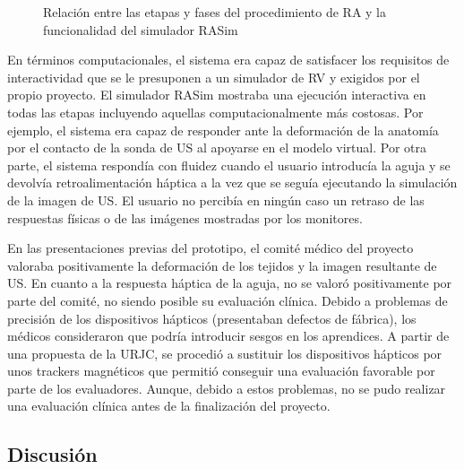  


\begin{figure}
    \centering
       \caption{Relación entre las etapas y fases del procedimiento de \ac{RA} y la funcionalidad del simulador \ac{RASim} }
    \label{fig:RAsteps}
\end{figure}

En términos computacionales, el sistema era capaz de satisfacer los requisitos de interactividad que se le presuponen a un simulador de \ac{RV} y exigidos por el propio proyecto. El simulador \ac{RASim} mostraba una ejecución interactiva en todas las etapas incluyendo aquellas computacionalmente más costosas. Por ejemplo, el sistema era capaz de responder ante la deformación de la anatomía por el contacto de la sonda de \ac{US} al apoyarse en el modelo virtual. Por otra parte, el sistema respondía con fluidez cuando el usuario introducía la aguja y se devolvía retroalimentación háptica a la vez que se seguía ejecutando la simulación de la imagen de \ac{US}. El usuario no percibía en ningún caso un retraso de las respuestas físicas o de las imágenes mostradas por los monitores.

En las presentaciones previas del prototipo, el comité médico del proyecto valoraba positivamente la deformación de los tejidos y la imagen resultante de \ac{US}. En cuanto a la respuesta háptica de la aguja, no se valoró positivamente por parte del comité, no siendo posible su evaluación clínica. Debido a problemas de precisión de los dispositivos hápticos (presentaban defectos de fábrica), los médicos consideraron que podría introducir sesgos en los aprendices. A partir de una propuesta de la \ac{URJC}, se procedió a sustituir los dispositivos hápticos por unos \acs{tracker}s magnéticos que permitió conseguir una evaluación favorable por parte de los evaluadores. Aunque, debido a estos problemas, no se pudo realizar una evaluación clínica antes de la finalización del proyecto.






\subsection{Discusión}
\label{rasim:discusion}

